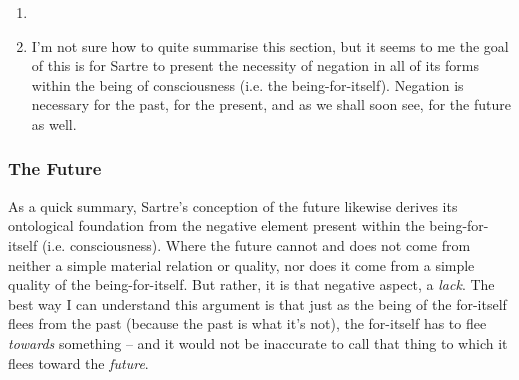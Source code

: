 \begin{enumerate}
  \item {}
  \item I'm not sure how to quite summarise this section, but it seems to me the goal of this is for Sartre to present the necessity of negation in all of its forms within the being of consciousness (i.e. the being-for-itself). Negation is necessary for the past, for the present, and as we shall soon see, for the future as well.
\end{enumerate}

\subsubsection*{The Future}
As a quick summary, Sartre's conception of the future likewise derives its ontological foundation from the negative element present within the being-for-itself (i.e. consciousness). Where the future cannot and does not come from neither a simple material relation or quality, nor does it come from a simple quality of the being-for-itself. But rather, it is that negative aspect, a \emph{lack}. The best way I can understand this argument is that just as the being of the for-itself flees from the past (because the past is what it's not), the for-itself has to flee \emph{towards} something -- and it would not be inaccurate to call that thing to which it flees toward the \emph{future}.

